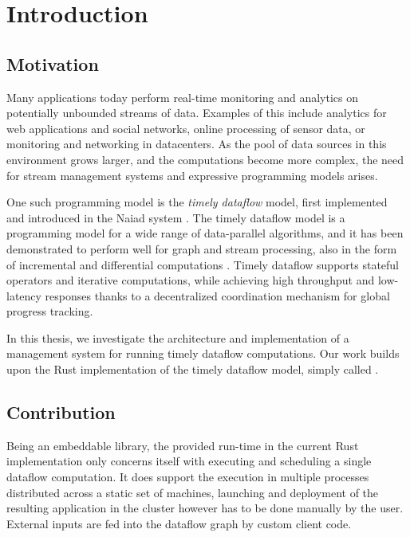\chapter{Introduction}\label{ch:introduction}

\section{Motivation}

Many applications today perform real-time monitoring and analytics on
potentially unbounded streams of data. Examples of this include analytics for
web applications and social networks, online processing of sensor data, 
or monitoring and networking in datacenters. As the pool of data sources
in this environment grows larger, and the computations become more complex,
the need for stream management systems and expressive programming models arises.

One such programming model is the \emph{timely dataflow} model, first implemented
and introduced in the Naiad system \cite{naiad}. The timely dataflow model
is a programming model for a wide range of data-parallel algorithms, and it has
been demonstrated to perform well for graph and stream processing, also in the
form of incremental and differential computations \cite{differential}.
Timely dataflow supports stateful operators and iterative computations, while
achieving high throughput and low-latency responses thanks to a decentralized
coordination mechanism for global progress tracking.

In this thesis, we investigate the architecture and implementation of a
management system for running timely dataflow computations. Our work
builds upon the Rust implementation of the timely dataflow model,
simply called  \cite{timely}.

\section{Contribution}

Being an embeddable library, the provided run-time in the current Rust implementation
only concerns itself with executing and scheduling a single dataflow computation.
It does support the execution in multiple processes distributed across a
static set of machines, launching and deployment of the resulting application
in the cluster however has to be done manually by the user. External inputs are
fed into the dataflow graph by custom client code.

